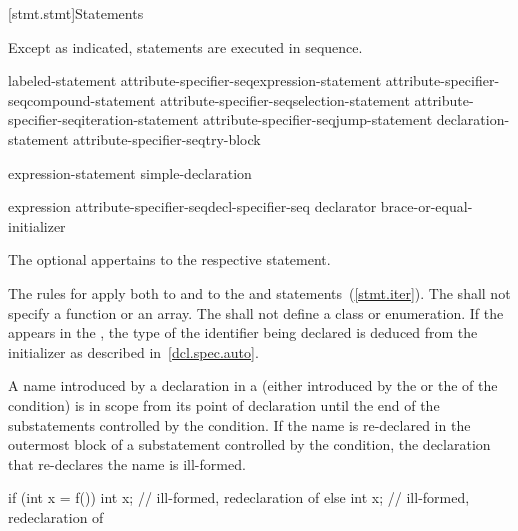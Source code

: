 [stmt.stmt]{Statements}%



\pnum
Except as indicated, statements are executed in sequence.

\begin{bnf}
\br
    labeled-statement\br
    attribute-specifier-seq\opt expression-statement\br
    attribute-specifier-seq\opt compound-statement\br
    attribute-specifier-seq\opt selection-statement\br
    attribute-specifier-seq\opt iteration-statement\br
    attribute-specifier-seq\opt jump-statement\br
    declaration-statement\br
    attribute-specifier-seq\opt try-block

\br
    expression-statement\br
    simple-declaration

\br
    expression\br
    attribute-specifier-seq\opt decl-specifier-seq declarator brace-or-equal-initializer
\end{bnf}

The optional  appertains to the respective statement.

\pnum
{}%
The rules for  apply both to
 and to the  and 
statements~(\ref{stmt.iter}). The  shall not
specify a function or an array. The  shall not
define a class or enumeration. If the   appears in
the ,
the type of the identifier being declared is deduced from the initializer as described in~\ref{dcl.spec.auto}.

\pnum
{}%
%
A name introduced by a declaration in a  (either
introduced by the  or the
 of the condition) is in scope from its point of
declaration until the end of the substatements controlled by the
condition. If the name is re-declared in the outermost block of a
substatement controlled by the condition, the declaration that
re-declares the name is ill-formed.
\begin{example}

\begin{codeblock}
if (int x = f()) {
  int x;            // ill-formed, redeclaration of 
}
else {
  int x;            // ill-formed, redeclaration of 
}
\end{codeblock}
\end{example}

